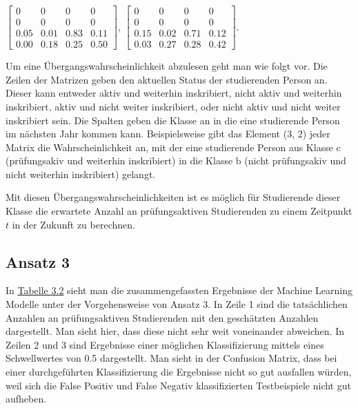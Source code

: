 $\left[ \begin{array}{rrrr} 0 & 0 & 0 & 0 \\  0 & 0 & 0 & 0 \\ 0.05 & 0.01 & 0.83 & 0.11\\ 0.00& 0.18 & 0.25 & 0.50\end{array}\right]$,
$\left[ \begin{array}{rrrr} 0 & 0 & 0 & 0 \\  0 & 0 & 0 & 0 \\ 0.15& 0.02& 0.71& 0.12\\ 0.03& 0.27& 0.28& 0.42 \end{array}\right]$.

Um eine \"Ubergangswahrscheinlichkeit abzulesen geht man wie folgt vor. Die Zeilen der Matrizen geben den aktuellen Status der studierenden Person an.
Dieser kann entweder \glqq aktiv und weiterhin inskribiert\grqq{}, \glqq nicht aktiv und weiterhin inskribiert\grqq{}, \glqq aktiv und nicht weiter inskribiert\grqq{}, oder \glqq nicht aktiv und nicht weiter inskribiert\grqq{} sein.
Die Spalten geben die Klasse an in die eine studierende Person im n\"achsten Jahr kommen kann. Beispielsweise gibt das Element (3, 2) jeder Matrix die Wahrscheinlichkeit an,
mit der eine studierende Person aus Klasse c (pr\"ufungsakiv und weiterhin inskribiert) in die Klasse b (nicht pr\"ufungsakiv und nicht weiterhin inskribiert) gelangt.


Mit diesen \"Ubergangswahrscheinlichkeiten ist es m\"oglich f\"ur Studierende dieser Klasse die erwartete Anzahl an pr\"ufungsaktiven Studierenden
zu einem Zeitpunkt $t$ in der Zukunft zu berechnen.

\subsection{Ansatz 3}

In \hyperref[tab:ergebnisA3P1]{Tabelle 3.2} sieht man die zusammengefassten Ergebnisse der  Machine Learning Modelle unter der Vorgehensweise von Ansatz 3.
In Zeile 1 sind die tats\"achlichen Anzahlen an pr\"ufungsaktiven Studierenden mit den gesch\"atzten Anzahlen dargestellt. Man sieht hier, dass diese nicht sehr weit voneinander abweichen.
In Zeilen 2 und 3 sind Ergebnisse einer m\"oglichen Klassifizierung mittels eines Schwellwertes von 0.5 dargestellt. Man sieht in der Confusion Matrix, dass bei einer
durchgef\"uhrten Klassifizierung die Ergebnisse nicht so gut ausfallen w\"urden, weil sich die False Positiv und False Negativ klassifizierten Testbeispiele nicht gut aufheben.


